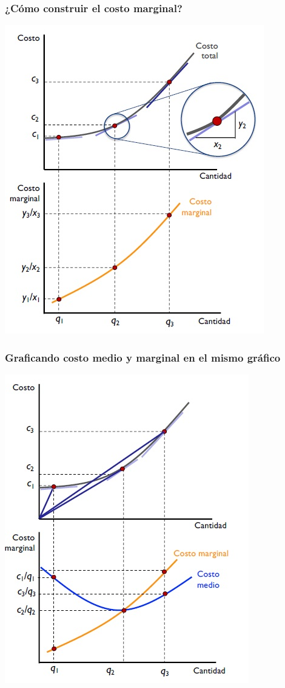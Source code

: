 \documentclass{beamer}
\begin{document}
\begin{frame}
\frametitle{ ¿Cómo construir el costo marginal?}
\centering
\includegraphics[scale=0.6]{Figures/Tema_06.26_costos5.jpg}
\end{frame}

\begin{frame}
\frametitle{ Graficando costo medio y marginal en el mismo gráfico}
\centering
\includegraphics[scale=0.5]{Figures/Tema_06.27_costos6.jpg}
\end{frame}
\end{document}
